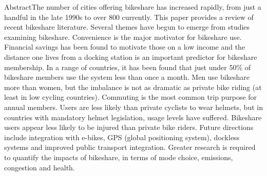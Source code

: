  AbstractThe number of cities offering bikeshare has increased rapidly, from just a handful in the late 1990s to over 800 currently. This paper provides a review of recent bikeshare literature. Several themes have begun to emerge from studies examining bikeshare. Convenience is the major motivator for bikeshare use. Financial savings has been found to motivate those on a low income and the distance one lives from a docking station is an important predictor for bikeshare membership. In a range of countries, it has been found that just under 50\% of bikeshare members use the system less than once a month. Men use bikeshare more than women, but the imbalance is not as dramatic as private bike riding (at least in low cycling countries). Commuting is the most common trip purpose for annual members. Users are less likely than private cyclists to wear helmets, but in countries with mandatory helmet legislation, usage levels have suffered. Bikeshare users appear less likely to be injured than private bike riders. Future directions include integration with e-bikes, GPS (global positioning system), dockless systems and improved public transport integration. Greater research is required to quantify the impacts of bikeshare, in terms of mode choice, emissions, congestion and health. 